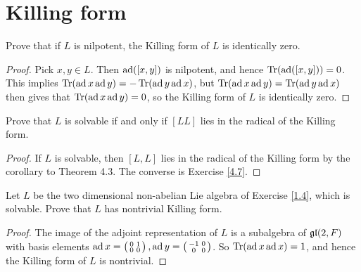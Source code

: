 \section{Killing form}




\begin{ex}
  Prove that if $L$ is nilpotent, the Killing form of $L$ is identically zero.
\end{ex}
\begin{proof}
  Pick $x, y \in L$. Then $\operatorname{ad}([x, y])$ is nilpotent, and hence $\operatorname{Tr}(\operatorname{ad}([x, y])) = 0$. This implies $\operatorname{Tr}(\operatorname{ad} x \operatorname{ad} y) = -\operatorname{Tr}(\operatorname{ad} y \operatorname{ad} x)$, but $\operatorname{Tr}(\operatorname{ad} x \operatorname{ad} y) = \operatorname{Tr}(\operatorname{ad} y \operatorname{ad} x)$ then gives that $\operatorname{Tr}(\operatorname{ad} x \operatorname{ad} y) = 0$, so the Killing form of $L$ is identically zero.
\end{proof}

\begin{ex}
  Prove that $L$ is solvable if and only if $[LL]$ lies in the radical of the Killing form.
\end{ex}
\begin{proof}
  If $L$ is solvable, then $[L,L]$ lies in the radical of the Killing form by the corollary to Theorem 4.3. The converse is Exercise \ref{4.7}.
\end{proof}

\begin{ex}\label{5.3}
  Let $L$ be the two dimensional non-abelian Lie algebra of Exercise \ref{1.4}, which is solvable. Prove that $L$ has nontrivial Killing form.
\end{ex}
\begin{proof}
  The image of the adjoint representation of $L$ is a subalgebra of $\mathfrak{g}\mathfrak{l}(2,F)$ with basis elements $\operatorname{ad} x=\begin{pmatrix}
           \begin{smallmatrix}
           0 & 1\\
           0 & 0 \\
           \end{smallmatrix}
         \end{pmatrix}
  , \operatorname{ad} y=\begin{pmatrix}
           \begin{smallmatrix}
           -1 & 0\\
           0 & 0 \\
           \end{smallmatrix}
         \end{pmatrix}$.
  So $\operatorname{Tr}(\operatorname{ad} x \operatorname{ad} x) = 1$, and hence the Killing form of $L$ is nontrivial.
\end{proof}

